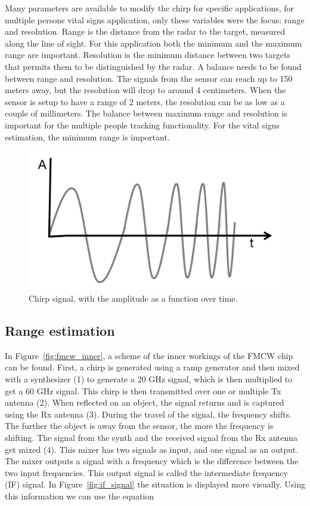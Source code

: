 Many parameters are available to modify the chirp for specific applications, for multiple persons vital signs application, only these variables were the focus: range and resolution. Range is the distance from the radar to the target, measured along the line of sight. For this application both the minimum and the maximum range are important. Resolution is the minimum distance between two targets that permits them to be distinguished by the radar. A balance needs to be found between range and resolution. The signals from the sensor can reach up to 150 meters away, but the resolution will drop to around 4 centimeters. When the sensor is setup to have a range of 2 meters, the resolution can be as low as a couple of millimeters. The balance between maximum range and resolution is important for the multiple people tracking functionality. For the vital signs estimation, the minimum range is important. 

\begin{figure}[t]
\centering
\includegraphics[width=.5\textwidth]{figures/background/chirp.png}
\caption{Chirp signal, with the amplitude as a function over time.}
\label{fig:chirp}
\end{figure}

\subsection{Range estimation}
In Figure~\ref{fig:fmcw_inner}, a scheme of the inner workings of the FMCW chip can be found. First, a chirp is generated using a ramp generator and then mixed with a synthesizer (1) to generate a 20 GHz signal, which is then multiplied to get a 60 GHz signal. This chirp is then transmitted over one or multiple Tx antenna (2). When reflected on an object, the signal returns and is captured using the Rx antenna (3). During the travel of the signal, the frequency shifts. The further the object is away from the sensor, the more the frequency is shifting. The signal from the synth and the received signal from the Rx antenna get mixed (4). This mixer has two signals as input, and one signal as an output. The mixer outputs a signal with a frequency which is the difference between the two input frequencies. This output signal is called the intermediate frequency (IF) signal. In Figure~\ref{fig:if_signal} the situation is displayed more visually. Using this information we can use the equation

